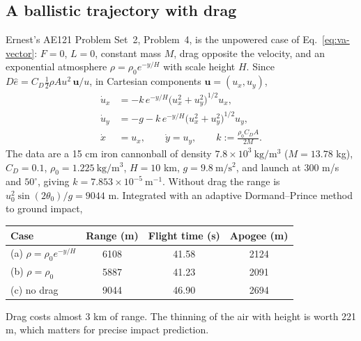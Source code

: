 \subsection{A ballistic trajectory with drag}
\label{sec:va-ballistic}
Ernest's AE121 Problem Set~2, Problem~4, is the unpowered case of
Eq.~\ref{eq:va-vector}: $F=0$, $L=0$, constant mass $M$, drag opposite the
velocity, and an exponential atmosphere $\rho=\rho_0e^{-y/H}$ with scale
height $H$. Since $D\hat e=C_D\tfrac12\rho Au^2\,\mathbf u/u$, in Cartesian
components $\mathbf u=(u_x,u_y)$,
\[
\begin{aligned}
 \dot u_x&=-k\,e^{-y/H}\bigl(u_x^2+u_y^2\bigr)^{1/2}u_x,\\
 \dot u_y&=-g-k\,e^{-y/H}\bigl(u_x^2+u_y^2\bigr)^{1/2}u_y,\\
 \dot x&=u_x,\qquad \dot y=u_y,
 \qquad k:=\frac{\rho_0C_DA}{2M}.
\end{aligned}
\]
The data are a 15 cm iron cannonball of density
$7.8\times10^3\ \mathrm{kg/m^3}$ ($M=13.78$ kg), $C_D=0.1$,
$\rho_0=1.225\ \mathrm{kg/m^3}$, $H=10$ km, $g=9.8\ \mathrm{m/s^2}$, and launch
at $300$ m/s and $50^\circ$, giving $k=7.853\times10^{-5}\ \mathrm{m^{-1}}$.
Without drag the range is $u_0^2\sin(2\theta_0)/g=9044$ m. Integrated with
an adaptive Dormand--Prince method to ground impact,
\begin{center}\small
\begin{tabular}{lccc}
Case & Range (m) & Flight time (s) & Apogee (m)\\ \hline
(a) $\rho=\rho_0e^{-y/H}$ & 6108 & 41.58 & 2124\\
(b) $\rho=\rho_0$ & 5887 & 41.23 & 2091\\
(c) no drag & 9044 & 46.90 & 2694\\
\end{tabular}
\end{center}
Drag costs almost 3 km of range. The thinning of the air with height is
worth 221 m, which matters for precise impact prediction.
